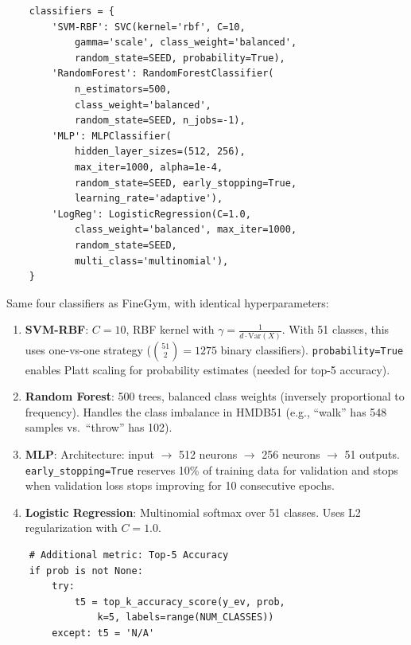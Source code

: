 \begin{lstlisting}
    classifiers = {
        'SVM-RBF': SVC(kernel='rbf', C=10,
            gamma='scale', class_weight='balanced',
            random_state=SEED, probability=True),
        'RandomForest': RandomForestClassifier(
            n_estimators=500,
            class_weight='balanced',
            random_state=SEED, n_jobs=-1),
        'MLP': MLPClassifier(
            hidden_layer_sizes=(512, 256),
            max_iter=1000, alpha=1e-4,
            random_state=SEED, early_stopping=True,
            learning_rate='adaptive'),
        'LogReg': LogisticRegression(C=1.0,
            class_weight='balanced', max_iter=1000,
            random_state=SEED,
            multi_class='multinomial'),
    }
\end{lstlisting}

\begin{explanation}
Same four classifiers as FineGym, with identical hyperparameters:

\begin{enumerate}[nosep]
  \item \textbf{SVM-RBF}: $C=10$, RBF kernel with $\gamma = \frac{1}{d \cdot \text{Var}(X)}$. With 51 classes, this uses one-vs-one strategy ($\binom{51}{2} = 1275$ binary classifiers). \texttt{probability=True} enables Platt scaling for probability estimates (needed for top-5 accuracy).

  \item \textbf{Random Forest}: 500 trees, balanced class weights (inversely proportional to frequency). Handles the class imbalance in HMDB51 (e.g., ``walk'' has 548 samples vs.\ ``throw'' has 102).

  \item \textbf{MLP}: Architecture: input $\to$ 512 neurons $\to$ 256 neurons $\to$ 51 outputs. \texttt{early\_stopping=True} reserves 10\% of training data for validation and stops when validation loss stops improving for 10 consecutive epochs.

  \item \textbf{Logistic Regression}: Multinomial softmax over 51 classes. Uses L2 regularization with $C=1.0$.
\end{enumerate}
\end{explanation}

\begin{lstlisting}
    # Additional metric: Top-5 Accuracy
    if prob is not None:
        try:
            t5 = top_k_accuracy_score(y_ev, prob,
                k=5, labels=range(NUM_CLASSES))
        except: t5 = 'N/A'
\end{lstlisting}

